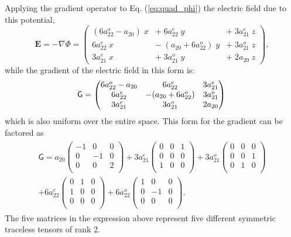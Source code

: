 Applying the gradient operator to Eq. (\ref{eq:quad_phi}) the electric
field due to this potential,
\begin{equation}
\mathbf{E} = -\nabla \Phi
= \left(\begin{array}{ccc}
\left( 6a_{22}^o -a_{20} \right)\; x &+\; 6a_{22}^e\; y &+\; 3a_{21}^e\;  z  \\
6a_{22}^e\; x & -\; (a_{20} + 6a_{22}^o)\; y & +\; 3a_{21}^o\; z \\
3a_{21}^e\; x & +\; 3a_{21}^o\; y & +\; 2a_{20}\; z
\end{array} \right),
\label{eq:MFE}
\end{equation}
while the gradient of the electric field in this form is:
\begin{equation} \label{eq:grad_e2}
\mathsf{G} = 
\begin{pmatrix}
6 a_{22}^o - a_{20} & 6a_{22}^e & 3a_{21}^e\\
6a_{22}^e & -(a_{20}+6a_{22}^o) & 3a_{21}^o \\
3a_{21}^e  &  3a_{21}^o & 2a_{20} \\
\end{pmatrix} \\
\end{equation}
which is also uniform over the entire space.  This form for the
gradient can be factored as
\begin{gather}
\begin{aligned}
\mathsf{G}  = a_{20} 
\begin{pmatrix}
-1 & 0 & 0\\
0 & -1 & 0\\
0 & 0 & 2\\
\end{pmatrix}
+3a_{21}^e
\begin{pmatrix}
0 & 0 & 1\\
0 & 0 & 0\\
1 & 0 & 0\\
\end{pmatrix}
+3a_{21}^o
\begin{pmatrix}
0 & 0 & 0\\
0 & 0 & 1\\
0 & 1 & 0\\
\end{pmatrix} \\
+6a_{22}^e
\begin{pmatrix}
0 & 1 & 0\\
1 & 0 & 0\\
0 & 0 & 0\\
\end{pmatrix}
+6a_{22}^o
\begin{pmatrix}
1 & 0 & 0\\
0 & -1 & 0\\
0 & 0 & 0\\
\end{pmatrix}.
\end{aligned}
 \label{eq:intro_tensors}
\end{gather}
The five matrices in the expression above represent five different
symmetric traceless tensors of rank 2. 


